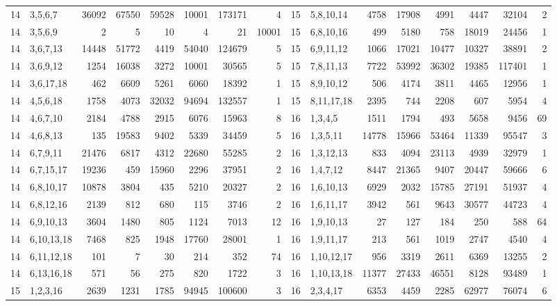 \begin{table}[tp]
\begin{ruledtabular}
\begin{tabular}{rlrrrrrr@{\hspace{2.2em}}rlrrrrrr}
14 & 3,5,6,7 & 36092 & 67550 & 59528 & 10001 & 173171 & 4 & 15 & 5,8,10,14 & 4758 & 17908 & 4991 & 4447 & 32104 & 2 \\
14 & 3,5,6,9 & 2 & 5 & 10 & 4 & 21 & 10001 & 15 & 6,8,10,16 & 499 & 5180 & 758 & 18019 & 24456 & 1 \\
14 & 3,6,7,13 & 14448 & 51772 & 4419 & 54040 & 124679 & 5 & 15 & 6,9,11,12 & 1066 & 17021 & 10477 & 10327 & 38891 & 2 \\
14 & 3,6,9,12 & 1254 & 16038 & 3272 & 10001 & 30565 & 5 & 15 & 7,8,11,13 & 7722 & 53992 & 36302 & 19385 & 117401 & 1 \\
14 & 3,6,17,18 & 462 & 6609 & 5261 & 6060 & 18392 & 1 & 15 & 8,9,10,12 & 506 & 4174 & 3811 & 4465 & 12956 & 1 \\
14 & 4,5,6,18 & 1758 & 4073 & 32032 & 94694 & 132557 & 1 & 15 & 8,11,17,18 & 2395 & 744 & 2208 & 607 & 5954 & 4 \\
14 & 4,6,7,10 & 2184 & 4788 & 2915 & 6076 & 15963 & 8 & 16 & 1,3,4,5 & 1511 & 1794 & 493 & 5658 & 9456 & 69 \\
14 & 4,6,8,13 & 135 & 19583 & 9402 & 5339 & 34459 & 5 & 16 & 1,3,5,11 & 14778 & 15966 & 53464 & 11339 & 95547 & 3 \\
14 & 6,7,9,11 & 21476 & 6817 & 4312 & 22680 & 55285 & 2 & 16 & 1,3,12,13 & 833 & 4094 & 23113 & 4939 & 32979 & 1 \\
14 & 6,7,15,17 & 19236 & 459 & 15960 & 2296 & 37951 & 2 & 16 & 1,4,7,12 & 8447 & 21365 & 9407 & 20447 & 59666 & 6 \\
14 & 6,8,10,17 & 10878 & 3804 & 435 & 5210 & 20327 & 2 & 16 & 1,6,10,13 & 6929 & 2032 & 15785 & 27191 & 51937 & 4 \\
14 & 6,8,12,16 & 2139 & 812 & 680 & 115 & 3746 & 2 & 16 & 1,6,11,17 & 3942 & 561 & 9643 & 30577 & 44723 & 4 \\
14 & 6,9,10,13 & 3604 & 1480 & 805 & 1124 & 7013 & 12 & 16 & 1,9,10,13 & 27 & 127 & 184 & 250 & 588 & 64 \\
14 & 6,10,13,18 & 7468 & 825 & 1948 & 17760 & 28001 & 1 & 16 & 1,9,11,17 & 213 & 561 & 1019 & 2747 & 4540 & 4 \\
14 & 6,11,12,18 & 101 & 7 & 30 & 214 & 352 & 74 & 16 & 1,10,12,17 & 956 & 3319 & 2611 & 6369 & 13255 & 2 \\
14 & 6,13,16,18 & 571 & 56 & 275 & 820 & 1722 & 3 & 16 & 1,10,13,18 & 11377 & 27433 & 46551 & 8128 & 93489 & 1 \\
15 & 1,2,3,16 & 2639 & 1231 & 1785 & 94945 & 100600 & 3 & 16 & 2,3,4,17 & 6353 & 4459 & 2285 & 62977 & 76074 & 6 \\

\end{tabular}
\end{ruledtabular}
\end{table}
